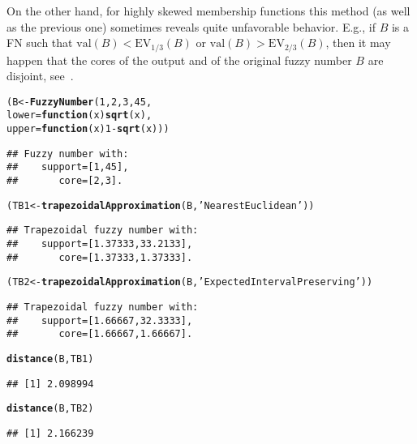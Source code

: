 \documentclass[11pt]{article}\usepackage[]{graphicx}\usepackage[]{color}
\makeatletter
\newcommand{\hlnum}[1]{\textcolor[rgb]{0.686,0.059,0.569}{#1}}%
\newcommand{\hlstr}[1]{\textcolor[rgb]{0.192,0.494,0.8}{#1}}%
\newcommand{\hlopt}[1]{\textcolor[rgb]{0,0,0}{#1}}%
\newcommand{\hlstd}[1]{\textcolor[rgb]{0.345,0.345,0.345}{#1}}%
\newcommand{\hlkwa}[1]{\textcolor[rgb]{0.161,0.373,0.58}{\textbf{#1}}}%
\newcommand{\hlkwb}[1]{\textcolor[rgb]{0.69,0.353,0.396}{#1}}%
\newcommand{\hlkwc}[1]{\textcolor[rgb]{0.333,0.667,0.333}{#1}}%
\newcommand{\hlkwd}[1]{\textcolor[rgb]{0.737,0.353,0.396}{\textbf{#1}}}%
\newenvironment{kframe}{%
 \def\at@end@of@kframe{}%
 \ifinner\ifhmode%
  \def\at@end@of@kframe{\end{minipage}}%
  \begin{minipage}{\columnwidth}%
 \fi\fi%
 \def\FrameCommand##1{\hskip\@totalleftmargin \hskip-\fboxsep
 \colorbox{shadecolor}{##1}\hskip-\fboxsep
     \hskip-\linewidth \hskip-\@totalleftmargin \hskip\columnwidth}%
 \MakeFramed {\advance\hsize-\width
   \@totalleftmargin\z@ \linewidth\hsize
   \@setminipage}}%
 {\par\unskip\endMakeFramed%
 \at@end@of@kframe}
\newenvironment{knitrout}{}{} %
\makeatother
\begin{document}


On the other hand, for highly skewed membership functions this method
(as well as the previous one)  sometimes reveals quite unfavorable
behavior. E.g., if $B$ is a FN such that
$\mathrm{val}(B) < \mathrm{EV}_{1/3}(B)$
or $\mathrm{val}(B) > \mathrm{EV}_{2/3}(B)$,
then it may happen that the cores of the output
and of the original fuzzy number $B$ are disjoint,
see~\cite{GrzegorzewskiPasternak2011:trapapproxsupcore}.

\begin{knitrout}\small
{}\color{fgcolor}\begin{kframe}
\begin{alltt}
\hlstd{(B}  \hlkwb{<-} \hlkwd{FuzzyNumber}\hlstd{(}\hlnum{1}\hlstd{,} \hlnum{2}\hlstd{,} \hlnum{3}\hlstd{,} \hlnum{45}\hlstd{,}
   \hlkwc{lower}\hlstd{=}\hlkwa{function}\hlstd{(}\hlkwc{x}\hlstd{)} \hlkwd{sqrt}\hlstd{(x),}
   \hlkwc{upper}\hlstd{=}\hlkwa{function}\hlstd{(}\hlkwc{x}\hlstd{)} \hlnum{1}\hlopt{-}\hlkwd{sqrt}\hlstd{(x)))}
\end{alltt}
\begin{verbatim}
## Fuzzy number with:
##    support=[1,45],
##       core=[2,3].
\end{verbatim}
\begin{alltt}
\hlstd{(TB1} \hlkwb{<-} \hlkwd{trapezoidalApproximation}\hlstd{(B,} \hlstr{'NearestEuclidean'}\hlstd{))}
\end{alltt}
\begin{verbatim}
## Trapezoidal fuzzy number with:
##    support=[1.37333,33.2133],
##       core=[1.37333,1.37333].
\end{verbatim}
\begin{alltt}
\hlstd{(TB2} \hlkwb{<-} \hlkwd{trapezoidalApproximation}\hlstd{(B,} \hlstr{'ExpectedIntervalPreserving'}\hlstd{))}
\end{alltt}
\begin{verbatim}
## Trapezoidal fuzzy number with:
##    support=[1.66667,32.3333],
##       core=[1.66667,1.66667].
\end{verbatim}
\begin{alltt}
\hlkwd{distance}\hlstd{(B, TB1)}
\end{alltt}
\begin{verbatim}
## [1] 2.098994
\end{verbatim}
\begin{alltt}
\hlkwd{distance}\hlstd{(B, TB2)}
\end{alltt}
\begin{verbatim}
## [1] 2.166239
\end{verbatim}
\end{kframe}
\end{knitrout}
\end{document}
